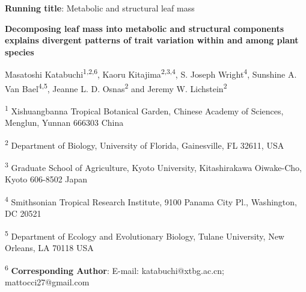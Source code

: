 \documentclass[
  12pt,
  letterpaper,
  DIV=11,
  numbers=noendperiod]{scrartcl}
\author{}
\date{}
\begin{document}
\ifdefined\Shaded\renewenvironment{Shaded}{\begin{tcolorbox}[sharp corners, boxrule=0pt, breakable, frame hidden, enhanced, interior hidden, borderline west={3pt}{0pt}{shadecolor}]}{\end{tcolorbox}}\fi

\textbf{Running title}: Metabolic and structural leaf mass

\textbf{Decomposing leaf mass into metabolic and structural components
explains divergent patterns of trait variation within and among plant
species}

Masatoshi Katabuchi\textsuperscript{1,2,6}, Kaoru
Kitajima\textsuperscript{2,3,4}, S. Joseph Wright\textsuperscript{4},
Sunshine A. Van Bael\textsuperscript{4,5}, Jeanne L. D.
Osnas\textsuperscript{2} and Jeremy W. Lichstein\textsuperscript{2}

\textsuperscript{1} Xishuangbanna Tropical Botanical Garden, Chinese
Academy of Sciences, Menglun, Yunnan 666303 China

\textsuperscript{2} Department of Biology, University of Florida,
Gainesville, FL 32611, USA

\textsuperscript{3} Graduate School of Agriculture, Kyoto University,
Kitashirakawa Oiwake-Cho, Kyoto 606-8502 Japan

\textsuperscript{4} Smithsonian Tropical Research Institute, 9100 Panama
City Pl., Washington, DC 20521

\textsuperscript{5} Department of Ecology and Evolutionary Biology,
Tulane University, New Orleans, LA 70118 USA

\textsuperscript{6} \textbf{Corresponding Author}: E-mail:
katabuchi@xtbg.ac.cn; mattocci27@gmail.com
\end{document}

